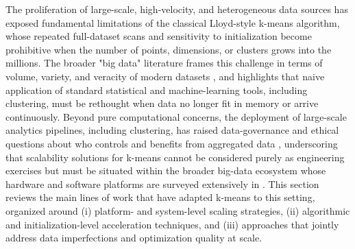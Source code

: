 The proliferation of large-scale, high-velocity, and heterogeneous data sources has exposed fundamental limitations of the classical Lloyd-style k-means algorithm, whose repeated full-dataset scans and sensitivity to initialization become prohibitive when the number of points, dimensions, or clusters grows into the millions. The broader "big data" literature frames this challenge in terms of volume, variety, and veracity of modern datasets \cite{varian2014big}, and highlights that naive application of standard statistical and machine-learning tools, including clustering, must be rethought when data no longer fit in memory or arrive continuously. Beyond pure computational concerns, the deployment of large-scale analytics pipelines, including clustering, has raised data-governance and ethical questions about who controls and benefits from aggregated data \cite{carbonell2016ethics}, underscoring that scalability solutions for k-means cannot be considered purely as engineering exercises but must be situated within the broader big-data ecosystem whose hardware and software platforms are surveyed extensively in \cite{singh2014survey}. This section reviews the main lines of work that have adapted k-means to this setting, organized around (i) platform- and system-level scaling strategies, (ii) algorithmic and initialization-level acceleration techniques, and (iii) approaches that jointly address data imperfections and optimization quality at scale.

